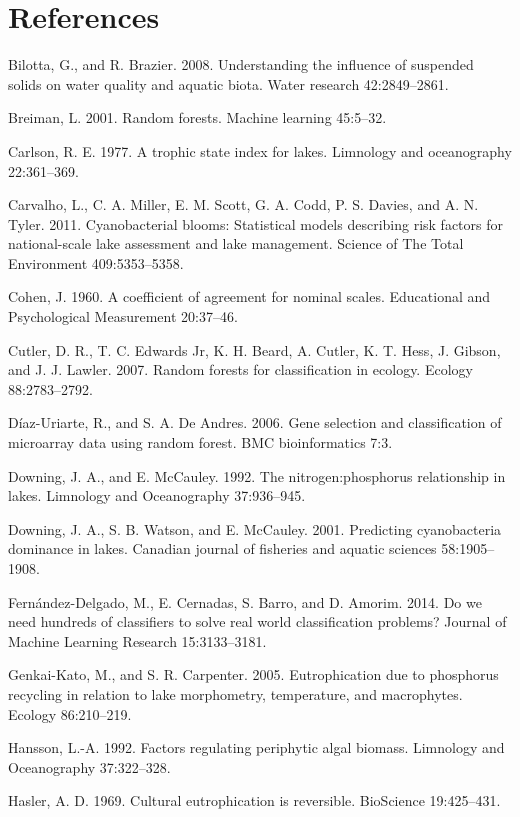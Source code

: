 \documentclass[12pt,]{article}
\begin{document}
\newpage

\section*{References}\label{references}

Bilotta, G., and R. Brazier. 2008. Understanding the influence of
suspended solids on water quality and aquatic biota. Water research
42:2849--2861.

Breiman, L. 2001. Random forests. Machine learning 45:5--32.

Carlson, R. E. 1977. A trophic state index for lakes. Limnology and
oceanography 22:361--369.

Carvalho, L., C. A. Miller, E. M. Scott, G. A. Codd, P. S. Davies, and
A. N. Tyler. 2011. Cyanobacterial blooms: Statistical models describing
risk factors for national-scale lake assessment and lake management.
Science of The Total Environment 409:5353--5358.

Cohen, J. 1960. A coefficient of agreement for nominal scales.
Educational and Psychological Measurement 20:37--46.

Cutler, D. R., T. C. Edwards Jr, K. H. Beard, A. Cutler, K. T. Hess, J.
Gibson, and J. J. Lawler. 2007. Random forests for classification in
ecology. Ecology 88:2783--2792.

D{í}az-Uriarte, R., and S. A. De Andres. 2006. Gene selection and
classification of microarray data using random forest. BMC
bioinformatics 7:3.

Downing, J. A., and E. McCauley. 1992. The nitrogen:phosphorus
relationship in lakes. Limnology and Oceanography 37:936--945.

Downing, J. A., S. B. Watson, and E. McCauley. 2001. Predicting
cyanobacteria dominance in lakes. Canadian journal of fisheries and
aquatic sciences 58:1905--1908.

Fernández-Delgado, M., E. Cernadas, S. Barro, and D. Amorim. 2014. Do we
need hundreds of classifiers to solve real world classification
problems? Journal of Machine Learning Research 15:3133--3181.

Genkai-Kato, M., and S. R. Carpenter. 2005. Eutrophication due to
phosphorus recycling in relation to lake morphometry, temperature, and
macrophytes. Ecology 86:210--219.

Hansson, L.-A. 1992. Factors regulating periphytic algal biomass.
Limnology and Oceanography 37:322--328.

Hasler, A. D. 1969. Cultural eutrophication is reversible. BioScience
19:425--431.
\end{document}
